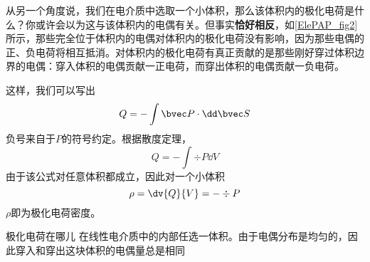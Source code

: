 从另一个角度说，我们在电介质中选取一个小体积，那么该体积内的极化电荷是什么？你或许会以为这与该体积内的电偶有关。但事实\textbf{恰好相反}，如\autoref{ElePAP_fig2} 所示，那些完全位于体积内的电偶对体积内的极化电荷没有影响，因为那些电偶的正、负电荷将相互抵消。对体积内的极化电荷有真正贡献的是那些刚好穿过体积边界的电偶：穿入体积的电偶贡献一正电荷，而穿出体积的电偶贡献一负电荷。

这样，我们可以写出
$$
Q= - \int \bvec P \cdot \dd \bvec S
$$
负号来自于$P$的符号约定。根据散度定理，
$$
Q= - \int \div P \dd V
$$
由于该公式对任意体积都成立，因此对一个小体积
\begin{equation}
\rho = \dv{Q}{V}= - \div P
\end{equation}
$\rho$即为极化电荷密度。

\begin{example}{极化电荷在哪儿}
在线性电介质中的内部任选一体积。由于电偶分布是均匀的，因此穿入和穿出这块体积的电偶量总是相同
\end{example}
